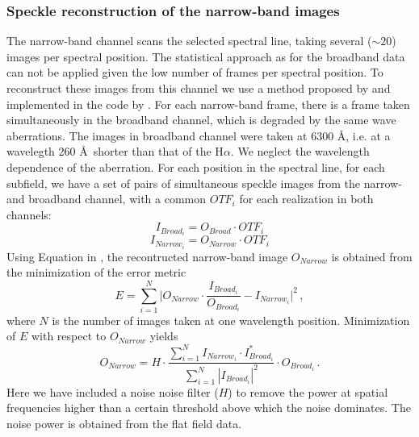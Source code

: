 \subsubsection{Speckle reconstruction of the narrow-band images\label{SIn}}
The narrow-band channel scans the selected spectral line, taking several ($\sim 20$) images per spectral position. The statistical approach as for the broadband data can not be applied given the low number of frames per spectral position. 
To reconstruct these images from this channel we use a method proposed by \cite{1992A&A...261..321K} and implemented in the code by \cite{2003PhDT.........2J}. For each narrow-band frame, there is a frame taken simultaneously in the broadband channel, which is degraded by the same wave aberrations. The images in broadband channel were taken at 6300 \AA, i.e. at a wavelegth 260 \AA\, shorter than that of the H$\alpha$. We neglect the wavelength dependence of the aberration.
For each position in the spectral line, for each subfield, we have a set of pairs of simultaneous speckle images from the narrow- and broadband channel, with a common $OTF_{i}$ for each realization in both channels:
\begin{equation}
  I_{Broad_{i}} = O_{Broad} \cdot OTF_{i}
  \label{ec:obs:narrow1}
\end{equation}
\begin{equation}
   I_{Narrow_{i}} = O_{Narrow} \cdot OTF_{i}
  \label{ec:obs:narrow1b}
\end{equation}
Using Equation \label{ec:obs:narrow1} in  \label{ec:obs:narrow1b}, the recontructed narrow-band image $O_{Narrow}$ is obtained from the minimization of the error metric
\begin{equation}
E= \sum_{i=1}^{N} \Big | O_{Narrow} \cdot \frac{I_{Broad_{i}}}{O_{Broad_{i}}}-I_{Narrow_{i}} \Big |^{2} \, ,
\label{ec:obs:narrow2}
\end{equation}
where $N$ is the number of images taken at one wavelength position. Minimization of $E$ with respect to $O_{Narrow}$ yields
\begin{equation}
  O_{Narrow} = H\cdot \frac{\sum_{i=1}^{N}I_{Narrow_{i}} \cdot I_{Broad_{i}}^{*}}{\sum_{i=1}^{N}|I_{Broad_{i}}|^{2}} \cdot O_{Broad_{i}} \, .
  \label{ec:obs:narrow3}
\end{equation}
Here we have included a noise noise filter ($H$) to remove the power at spatial frequencies higher than a certain threshold above which the noise dominates. The noise power is obtained from the flat field data.

